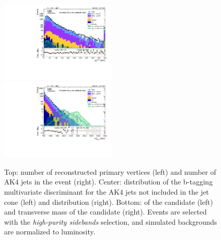 \begin{figure}[!htb]
\begin{center}
    \includegraphics[width=0.495\textwidth]{plots/v9_U/XVZnnhpSB/X_pt.pdf}
    \includegraphics[width=0.495\textwidth]{plots/v9_U/XVZnnhpSB/X_tmass.pdf}

    \caption{Top: number of reconstructed primary vertices (left) and number of AK4 jets in the event (right). Center: distribution of the b-tagging multivariate discriminant for the AK4 jets not included in the \V jet cone (left) and \MET distribution (right). Bottom: \pt of the \VZ candidate (left) and transverse mass of the \VZ candidate (right). Events are selected with the \emph{high-purity sidebands} selection, and simulated backgrounds are normalized to luminosity.}
  \end{center}
\end{figure}

\clearpage


